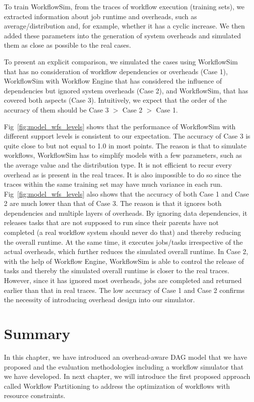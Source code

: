 To train WorkflowSim, from the traces of workflow execution (training sets), we extracted information about job runtime and overheads, such as average/distribution and, for example, whether it has a cyclic increase. We then added these parameters into the generation of system overheads and simulated them as close as possible to the real cases. 

To present an explicit comparison, we simulated the cases using WorkflowSim that has no consideration of workflow dependencies or overheads (Case 1), WorkflowSim with Workflow Engine that has considered the influence of dependencies but ignored system overheads (Case 2), and WorkflowSim, that has covered both aspects (Case 3). Intuitively, we expect that the order of the accuracy of them should be Case 3 $>$ Case 2 $>$ Case 1. 

Fig~\ref{fig:model_wfs_levels} shows that the performance of WorkflowSim with different support levels is consistent to our expectation. The accuracy of Case 3 is quite close to but not equal to 1.0 in most points. The reason is that to simulate workflows, WorkflowSim has to simplify models with a few parameters, such as the average value and the distribution type. It is not efficient to recur every overhead as is present in the real traces. It is also impossible to do so since the traces within the same training set may have much variance in each run. Fig~\ref{fig:model_wfs_levels} also shows that the accuracy of both Case 1 and Case 2 are much lower than that of Case 3. The reason is that it ignores both dependencies and multiple layers of overheads. By ignoring data dependencies, it releases tasks that are not supposed to run since their parents have not completed (a real workflow system should never do that) and thereby reducing the overall runtime. At the same time, it executes jobs/tasks irrespective of the actual overheads, which further reduces the simulated overall runtime. In Case 2, with the help of Workflow Engine, WorkflowSim is able to control the release of tasks and thereby the simulated overall runtime is closer to the real traces. However, since it has ignored most overheads, jobs are completed and returned earlier than that in real traces. The low accuracy of Case 1 and Case 2 confirms the necessity of introducing overhead design into our simulator. 


\section{Summary}

In this chapter, we have introduced an overhead-aware DAG model that we have proposed and the evaluation methodologies including a workflow simulator that we have developed. In next chapter, we will introduce the first proposed approach called Workflow Partitioning to address the optimization of workflows with resource constraints.

